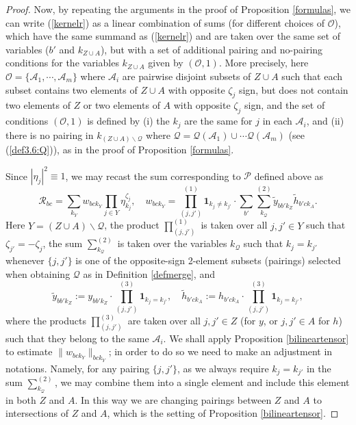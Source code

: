 \documentclass[11 pt,reqno]{amsart}
\theoremstyle{definition}
\theoremstyle{remark}
\numberwithin{equation}{section}
\newcommand{\Qc}{\mathcal{Q}}
\newcommand{\Rc}{\mathcal{R}}
\newcommand{\Ac}{\mathcal{A}}
\newcommand{\Ps}{\mathscr{P}}
\newcommand{\Os}{\mathscr{O}}
\begin{document}
{\begin{proof}
 Now, by repeating the arguments in the proof of Proposition \ref{formulas}, we can write (\ref{kernelr}) as a linear combination of sums (for different choices of $\Os$), which have the same summand as (\ref{kernelr}) and are taken over the same set of variables ($b'$ and $k_{Z\cup A}$), but with a set of additional pairing and no-pairing conditions for the variables $k_{Z\cup A}$ given by $(\Os,1)$. More precisely, here $\Os=\{\Ac_1,\cdots,\Ac_m\}$ where $\Ac_i$ are pairwise disjoint subsets of $Z\cup A$ such that each subset contains two elements of $Z\cup A$ with opposite $\zeta_j$ sign, but does not contain two elements of $Z$ or two elements of $A$ with opposite $\zeta_j$ sign, and the set of conditions $(\Os,1)$ is defined by (i) the $k_j$ are the same for $j$ in each $\Ac_i$, and (ii) there is no pairing in $k_{(Z\cup A)\backslash\Qc}$ where $\Qc=\Qc(\Ac_1)\cup\cdots\Qc(\Ac_m)$ (see (\ref{def3.6:Q})), as in the proof of Proposition \ref{formulas}.
 
 Since $|\eta_j|^2\equiv 1$, we may recast the sum corresponding to $\Ps$ defined above as  \begin{equation}\label{descent1}\Rc_{bc}=\sum_{k_Y}w_{bck_Y}\prod_{j\in Y}\eta_{k_j}^{\zeta_j},\quad w_{bck_Y}=\prod_{(j,j')}^{(1)}\mathbf{1}_{k_j\neq k_{j'}}\cdot\sum_{b'}\sum_{k_{\Qc}}^{(2)}\widetilde{y}_{bb'k_Z}\widetilde{h}_{b'ck_A}.\end{equation} Here $Y=(Z\cup A)\backslash \Qc$, the product $\prod_{(j,j')}^{(1)}$ is taken over all $j,j'\in Y$ such that $\zeta_{j'}=-\zeta_{j}$, the sum $\sum_{k_{\Qc}}^{(2)}$ is taken over the variables $k_{\Qc}$ such that $k_j=k_{j'}$ whenever $\{j,j'\}$ is one of the opposite-sign 2-element subsets (pairings) selected when obtaining $\Qc$ as in Definition \ref{defmerge}, and
 \begin{equation}\label{descent2}\widetilde{y}_{bb'k_Z}:=y_{bb'k_Z}\cdot\prod_{(j,j')}^{(3)}\mathbf{1}_{k_j=k_{j'}},\quad \widetilde{h}_{b'ck_A}:=h_{b'ck_A}\cdot\prod_{(j,j')}^{(3)}\mathbf{1}_{k_j=k_{j'}},\end{equation} where the products $\prod_{(j,j')}^{(3)}$ are taken over all $j,j'\in Z$ (for $y$, or $j,j'\in A$ for $h$) such that they belong to the same $\Ac_i$. We shall apply Proposition \ref{bilineartensor} to estimate $\|w_{bck_Y}\|_{bck_Y}$; in order to do so we need to make an adjustment in notations. Namely, for any pairing $\{j,j'\}$, as we always require $k_j=k_{j'}$ in the sum $\sum_{k_{\Qc}}^{(2)}$, we may combine them into a single element and include this element in both $Z$ and $A$. In this way we are changing pairings between $Z$ and $A$ to intersections of $Z$ and $A$, which is the setting of Proposition \ref{bilineartensor}.


\end{proof}}
\end{document}
